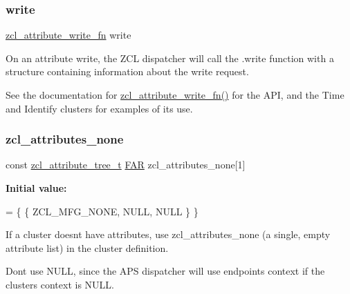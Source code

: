 \subsubsection{\texorpdfstring{write}{write}}
{\footnotesize\ttfamily \hyperlink{group__zcl_ga70fa1740c517a1e49c700cba7cf6b339}{zcl\+\_\+attribute\+\_\+write\+\_\+fn} write}



On an attribute write, the Z\+CL dispatcher will call the .write function with a structure containing information about the write request. 

See the documentation for \hyperlink{group__zcl_ga70fa1740c517a1e49c700cba7cf6b339}{zcl\+\_\+attribute\+\_\+write\+\_\+fn()} for the A\+PI, and the Time and Identify clusters for examples of its use. \mbox{\label{group__zcl_gad1e7f7dd501a7ab02f6004e4091c6bea}} 
\subsubsection{\texorpdfstring{zcl\+\_\+attributes\+\_\+none}{zcl\_attributes\_none}\hspace{0.1cm}{\footnotesize\ttfamily [1/2]}}
{\footnotesize\ttfamily const \hyperlink{structzcl__attribute__tree__t}{zcl\+\_\+attribute\+\_\+tree\+\_\+t} \hyperlink{group__hal_gaef060b3456fdcc093a7210a762d5f2ed}{F\+AR} zcl\+\_\+attributes\+\_\+none\mbox{[}1\mbox{]}}

{\bfseries Initial value\+:}
\begin{DoxyCode}
=
   \{ \{ ZCL\_MFG\_NONE, NULL, NULL \} \}
\end{DoxyCode}


If a cluster doesn\textquotesingle{}t have attributes, use zcl\+\_\+attributes\+\_\+none (a single, empty attribute list) in the cluster definition. 

Don\textquotesingle{}t use N\+U\+LL, since the A\+PS dispatcher will use endpoint\textquotesingle{}s context if the cluster\textquotesingle{}s context is N\+U\+LL. \mbox{\label{group__zcl_gad1e7f7dd501a7ab02f6004e4091c6bea}} 
